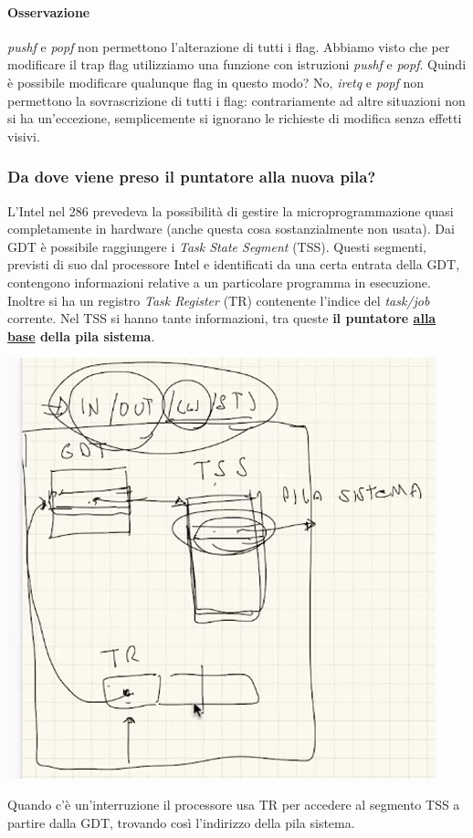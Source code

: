 \documentclass[11pt]{report}
\theoremstyle{definition}
\begin{document}
\paragraph{Osservazione} \emph{pushf} e \emph{popf} non permettono l'alterazione di tutti i flag. Abbiamo visto che per modificare il trap flag utilizziamo una funzione con istruzioni \emph{pushf} e \emph{popf}. Quindi è possibile modificare qualunque flag in questo modo? No, \emph{iretq} e \emph{popf} non permettono la sovrascrizione di tutti i flag: contrariamente ad altre situazioni non si ha un'eccezione, semplicemente si ignorano le richieste di modifica senza effetti visivi.

\subsubsection{Da dove viene preso il puntatore alla nuova pila?} 
L'Intel nel 286 prevedeva la possibilità di gestire la microprogrammazione quasi completamente in hardware (anche questa cosa sostanzialmente non usata). Dai GDT è possibile raggiungere i \emph{Task State Segment} (TSS). Questi segmenti, previsti di suo dal processore Intel e identificati da una certa entrata della GDT, contengono informazioni relative a un particolare programma in esecuzione. Inoltre si ha un registro \emph{Task Register} (TR) contenente l'indice del \emph{task/job} corrente. Nel TSS si hanno tante informazioni, tra queste \textbf{il puntatore \underline{alla base} della pila sistema}. 
\begin{center}\includegraphics[scale=.75]{img/121.PNG}\end{center}
Quando c'è un'interruzione il processore usa TR per accedere al segmento TSS a partire dalla GDT, trovando così l'indirizzo della pila sistema.
\end{document}
